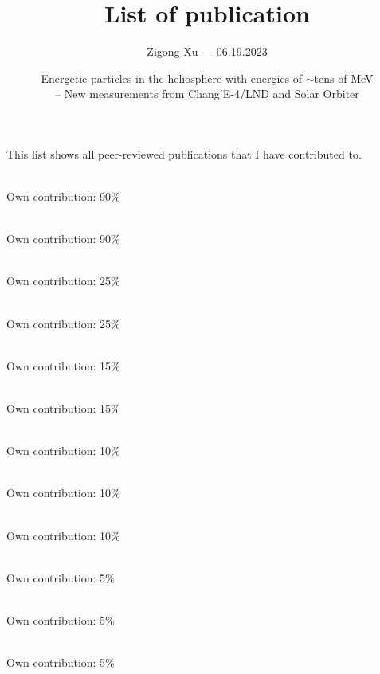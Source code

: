 \documentclass{scrartcl}
\title{\vspace{-2cm} List of publication \vspace{-2ex}}
\author{Zigong Xu ---  06.19.2023}
\date{\vspace{-1ex} Energetic particles in the heliosphere with energies of $\sim$tens of MeV \\ -- New measurements from Chang'E-4/LND and Solar Orbiter}
\begin{document}
	\maketitle
	\vspace{-1ex}
	
	
This list shows all peer-reviewed publications that I have contributed to.\\

\noindent{}\\ \strut \hfill Own contribution: 90\%\\

\noindent{}\\ \strut \hfill Own contribution: 90\%\\

\noindent{}\\ \strut \hfill Own contribution: 25\%\\

\noindent{} \\ \strut \hfill Own contribution: 25\%\\

\noindent{}\\ \strut \hfill Own contribution: 15\%\\

\noindent{}\\ \strut \hfill Own contribution: 15\%\\

\noindent{}\\ \strut \hfill Own contribution: 10\%\\

\noindent{}\\ \strut \hfill Own contribution: 10\%\\

\noindent{}\\ \strut \hfill Own contribution: 10\%\\

\noindent{}\\ \strut \hfill Own contribution: 5\%\\

\noindent{}\\  \strut \hfill  Own contribution: 5\%\\

\noindent{}\\ \strut \hfill Own contribution: 5\%\\
\end{document}
